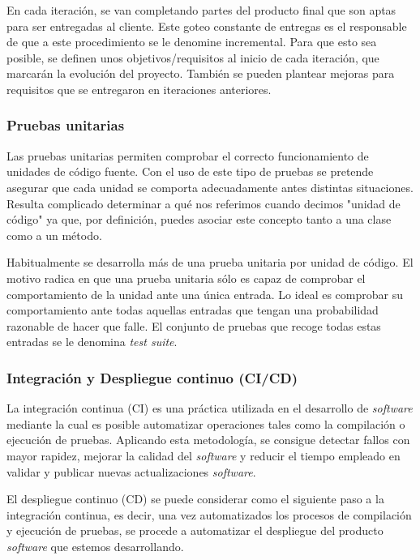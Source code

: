 \documentclass[
]{article}
\begin{document}
En cada iteración, se van completando partes del producto final que son
aptas para ser entregadas al cliente. Este goteo constante de entregas
es el responsable de que a este procedimiento se le denomine
incremental. Para que esto sea posible, se definen unos
objetivos/requisitos al inicio de cada iteración, que marcarán la
evolución del proyecto. También se pueden plantear mejoras para
requisitos que se entregaron en iteraciones anteriores.

\hypertarget{pruebas-unitarias}{%
\subsubsection{Pruebas unitarias}\label{pruebas-unitarias}}

Las pruebas unitarias permiten comprobar el correcto funcionamiento de
unidades de código fuente. Con el uso de este tipo de pruebas se
pretende asegurar que cada unidad se comporta adecuadamente antes
distintas situaciones. Resulta complicado determinar a qué nos referimos
cuando decimos "unidad de código" ya que, por definición, puedes asociar
este concepto tanto a una clase como a un método.

Habitualmente se desarrolla más de una prueba unitaria por unidad de
código. El motivo radica en que una prueba unitaria sólo es capaz de
comprobar el comportamiento de la unidad ante una única entrada. Lo
ideal es comprobar su comportamiento ante todas aquellas entradas que
tengan una probabilidad razonable de hacer que falle. El conjunto de
pruebas que recoge todas estas entradas se le denomina \emph{test
suite}.

\hypertarget{integraciuxf3n-y-despliegue-continuo-cicd}{%
\subsubsection{Integración y Despliegue continuo
(CI/CD)}\label{integraciuxf3n-y-despliegue-continuo-cicd}}

La integración continua (CI) es una práctica utilizada en el desarrollo
de \emph{software} mediante la cual es posible automatizar operaciones
tales como la compilación o ejecución de pruebas. Aplicando esta
metodología, se consigue detectar fallos con mayor rapidez, mejorar la
calidad del \emph{software} y reducir el tiempo empleado en validar y
publicar nuevas actualizaciones \emph{software}.

El despliegue continuo (CD) se puede considerar como el siguiente paso a
la integración continua, es decir, una vez automatizados los procesos de
compilación y ejecución de pruebas, se procede a automatizar el
despliegue del producto \emph{software} que estemos desarrollando.
\end{document}
